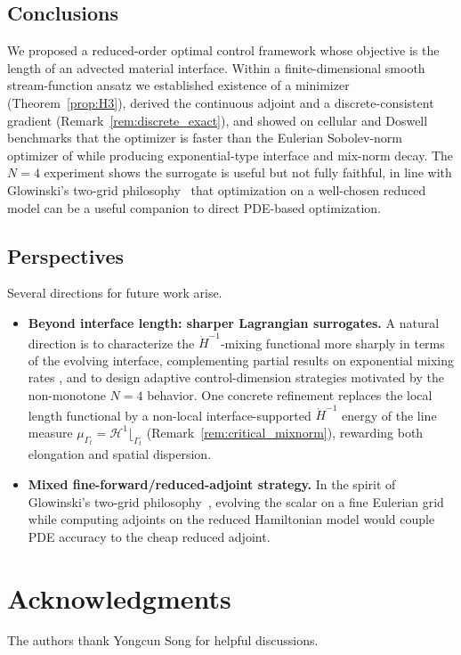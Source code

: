 \documentclass[12pt, reqno]{amsart}
\theoremstyle{plain}
\theoremstyle{definition}
\numberwithin{equation}{section}
\numberwithin{figure}{section}
\numberwithin{algorithm}{section}
\begin{document}
\subsection{Conclusions}
We proposed a reduced-order optimal control framework whose objective is the length of an advected material interface. Within a finite-dimensional smooth stream-function ansatz we established existence of a minimizer (Theorem~\ref{prop:H3}), derived the continuous adjoint and a discrete-consistent gradient (Remark~\ref{rem:discrete_exact}), and showed on cellular and Doswell benchmarks that the optimizer is faster than the Eulerian Sobolev-norm optimizer of \cite{hu2026structure} while producing exponential-type interface and mix-norm decay. The $N=4$ experiment shows the surrogate is useful but not fully faithful, in line with Glowinski's two-grid philosophy~\cite{Glowinski1992} that optimization on a well-chosen reduced model can be a useful companion to direct PDE-based optimization.

\subsection{Perspectives}
Several directions for future work arise.
\begin{itemize}
\item \textbf{Beyond interface length: sharper Lagrangian surrogates.}
A natural direction is to characterize the $\dot{H}^{-1}$-mixing functional more sharply in terms of the evolving interface, complementing partial results on exponential mixing rates \cite{alberti2016exponential, crippa2017cellular, brue2024enhanced}, and to design adaptive control-dimension strategies motivated by the non-monotone $N=4$ behavior. One concrete refinement replaces the local length functional by a non-local interface-supported $\dot{H}^{-1}$ energy of the line measure $\mu_{\Gamma_t}=\mathcal H^1\!\lfloor_{\Gamma_t}$ (Remark~\ref{rem:critical_mixnorm}), rewarding both elongation and spatial dispersion.

\item \textbf{Mixed fine-forward/reduced-adjoint strategy.} In the spirit of Glowinski's two-grid philosophy~\cite{Glowinski1992}, evolving the scalar on a fine Eulerian grid while computing adjoints on the reduced Hamiltonian model would couple PDE accuracy to the cheap reduced adjoint.
\end{itemize}




\section*{Acknowledgments}
The authors thank Yongcun Song for helpful discussions.




\end{document}
